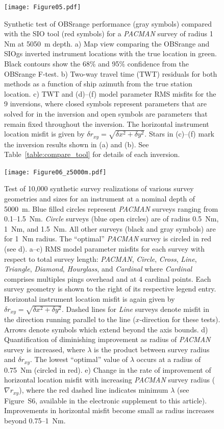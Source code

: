 \newpage

\begin{figure}[h]
\texttt{[image: Figure05.pdf]}
\caption{ Synthetic test of OBSrange performance (gray symbols) compared with the SIO tool (red symbols) for a \textit{PACMAN} survey of radius 1 Nm at 5050~m depth. a) Map view comparing the OBSrange and SIOgs inverted instrument locations with the true location in green. Black contours show the 68\% and 95\% confidence from the OBSrange F-test. b) Two-way travel time (TWT) residuals for both methods as a function of ship azimuth from the true station location. c) TWT and (d)--(f) model parameter RMS misfits for the 9 inversions, where closed symbols represent parameters that are solved for in the inversion and open symbols are parameters that remain fixed throughout the inversion. The horizontal instrument location misfit is given by $\delta r_{xy} = \sqrt{\delta x^2 + \delta y^2} $. Stars in (c)--(f) mark the inversion results shown in (a) and (b). See Table~\ref{table:compare_tool} for details of each inversion.}
\label{fig:compare_tool}
\end{figure}

\newpage

\begin{figure}[h]
\texttt{[image: Figure06\_z5000m.pdf]}
\caption{ Test of 10,000 synthetic survey realizations of various survey geometries and sizes for an instrument at a nominal depth of 5000~m. Blue filled circles represent \textit{PACMAN} surveys ranging from 0.1--1.5~Nm. \textit{Circle} surveys (blue open circles) are of radius 0.5~Nm, 1~Nm, and 1.5~Nm. All other surveys (black and gray symbols) are for 1~Nm radius. The ``optimal'' \textit{PACMAN} survey is circled in red (see d). a--c) RMS model parameter misfits for each survey with respect to total survey length: \textit{PACMAN}, \textit{Circle}, \textit{Cross}, \textit{Line}, \textit{Triangle}, \textit{Diamond}, \textit{Hourglass}, and \textit{Cardinal} where \textit{Cardinal} comprises multiples pings overhead and at 4 cardinal points. Each survey geometry is shown to the right of its respective legend entry. Horizontal instrument location misfit is again given by $\delta r_{xy} = \sqrt{\delta x^2 + \delta y^2} $. Dashed lines for \textit{Line} surveys denote misfit in the direction running parallel to the line ($x$-direction for these tests). Arrows denote symbols which extend beyond the axis bounds. d) Quantification of diminishing improvement as radius of \textit{PACMAN} survey is increased, where $\lambda$ is the product between survey radius and $\delta r_{xy}$. The lowest ``optimal'' value of $\lambda$ occurs at a radius of 0.75~Nm (circled in red). e) Change in the rate of improvement of horizontal location misfit with increasing \textit{PACMAN} survey radius ($\nabla r_{xy}$), where the red dashed line indicates minimum $\lambda$ (see Figure~S6, available in the electronic supplement to this article). Improvements in horizontal misfit become small as radius increases beyond 0.75--1~Nm.}
\label{fig:survey_geom_explore}
\end{figure}

